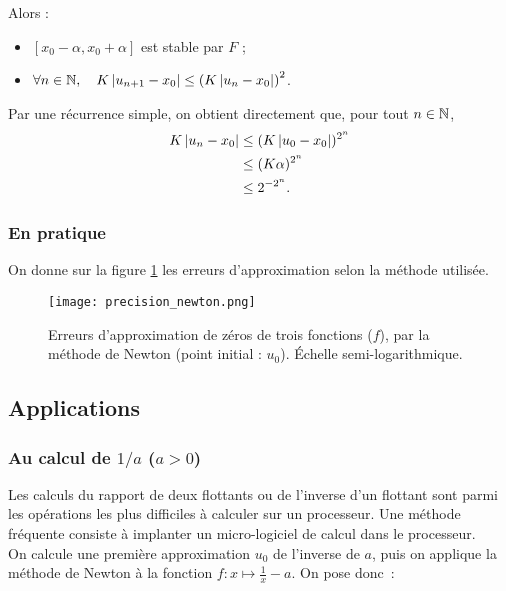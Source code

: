 Alors :
\begin{itemize}
\item $[x_{0}-\alpha, x_{0}+\alpha]$ est stable par $F$ ;
\item $\forall n\in\mathbb{N},\quad K\left|u_{n+1}-x_{0}\right|\leq \left( K\left|u_{n}-x_{0}\right|\right)^{2}$.
\end{itemize}
Par une récurrence simple, on obtient directement que, pour tout $n\in \mathbb{N}$,
\begin{align*}
  K\left|u_{n}-x_{0}\right|&\leq  (K\left|u_{0}-x_{0}\right|)^{2^{n}}\\
                    &\leq (K\alpha)^{2^n}\\
                    &\leq 2^{-2^{n}}.
\end{align*}

\subsubsection{En pratique}

On donne sur la figure \ref{precision} les erreurs d'approximation selon la méthode utilisée.

\begin{figure}[!h]
\begin{center}
  \texttt{[image: precision\_newton.png]}
  \caption{Erreurs d'approximation de zéros de trois fonctions ($f$), par la méthode de Newton (point initial : $u_0$). Échelle semi-logarithmique. \label{precision}}
\end{center}
\end{figure}
\subsection{Applications}
\subsubsection{Au calcul de $1/a$ ($a>0$)}

Les calculs du rapport de deux flottants ou de l'inverse d'un flottant sont parmi les opérations les plus 
difficiles à calculer sur un processeur. Une méthode fréquente consiste à implanter un micro-logiciel de calcul dans le 
processeur.\\

On calcule une première approximation $u_{0}$ de l'inverse de $a$, puis on applique la méthode de Newton à la fonction
$f: x\mapsto \frac{1}{x} - a$. On pose donc~:

